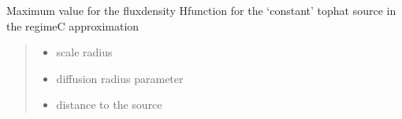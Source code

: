 \documentclass[letterpaper,10pt,english]{sphinxmanual}
\begin{document}
\begin{fulllineitems}
\label{\detokenize{diffsph.profiles:diffsph.profiles.analytics.cofdCmax}}
\pysigstartsignatures
{}
\pysigstopsignatures
\sphinxAtStartPar
Maximum value for the flux\sphinxhyphen{}density H\sphinxhyphen{}function for the ‘constant’ top\sphinxhyphen{}hat source in the regime\sphinxhyphen{}C approximation
\begin{quote}\begin{description}
\begin{itemize}
\item {} 
\sphinxAtStartPar
{} \textendash{} scale radius

\item {} 
\sphinxAtStartPar
{} \textendash{} diffusion radius parameter

\item {} 
\sphinxAtStartPar
{} \textendash{} distance to the source

\end{itemize}

\end{description}\end{quote}

\end{fulllineitems}

\end{document}
